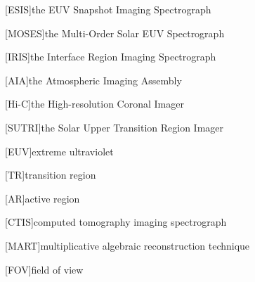 %
%
%

[ESIS]{the EUV Snapshot Imaging Spectrograph}
\newcommand{\ESIS}{\ac{ESIS}}
\newcommand{\ESISCapital}{\Ac{ESIS}}

[MOSES]{the Multi-Order Solar EUV Spectrograph}
\newcommand{\MOSES}{\ac{MOSES}}
\newcommand{\MOSESCapital}{\Ac{MOSES}}

[IRIS]{the Interface Region Imaging Spectrograph}
\newcommand{\IRIS}{\ac{IRIS}}
\newcommand{\IRISCapital}{\Ac{IRIS}}

[AIA]{the Atmospheric Imaging Assembly}
\newcommand{\AIA}{\ac{AIA}}
\newcommand{\AIACapital}{\Ac{AIA}}

[Hi{-}C]{the High-resolution Coronal Imager}
\newcommand{\HiC}{\ac{HiC}}
\newcommand{\HiCCapital}{\Ac{HiC}}

[SUTRI]{the Solar Upper Transition Region Imager}
\newcommand{\SUTRI}{\ac{SUTRI}}
\newcommand{\SUTRICapital}{\Ac{SUTRI}}

[EUV]{extreme ultraviolet}
\newcommand{\EUV}{\ac{EUV}}
\newcommand{\EUVCapital}{\Ac{EUV}}

[TR]{transition region}
\newcommand{\TR}{\ac{TR}}
\newcommand{\TRCapital}{\Ac{TR}}

[AR]{active region}
\newcommand{\AR}{\ac{AR}}
\newcommand{\ARs}{\acp{AR}}
\newcommand{\ARShort}{\acs{AR}}
\newcommand{\ARCapital}{\Ac{AR}}
\newcommand{\ARCapitals}{\Acp{AR}}

[CTIS]{computed tomography imaging spectrograph}
\newcommand{\CTIS}{\ac{CTIS}}
\newcommand{\CTISs}{\acp{CTIS}}
\newcommand{\CTISCapital}{\Ac{CTIS}}
\newcommand{\CTISCapitals}{\Acp{CTIS}}

[MART]{multiplicative algebraic reconstruction technique}
\newcommand{\MART}{\ac{MART}}
\newcommand{\MARTCapital}{\Ac{MART}}

[FOV]{field of view}
\newcommand{\FOV}{\ac{FOV}}
\newcommand{\FOVCapital}{\Ac{FOV}}

